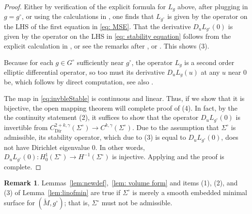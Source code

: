 \documentclass[11pt]{amsart}
\theoremstyle{definition}
\newtheorem{Remark}[Theorem]{Remark}
\numberwithin{equation}{section}
\begin{document}
\begin{proof}
Either by verification of the explicit formula for $L_{g}$ above, after plugging in $g=g^\circ$, or using the calculations in \cite[\S~3.1]{carstea2024calder}, one finds that $L_{g^\circ}$ is given by the operator on the LHS of the first equation in \eqref{eq: MSE}. That the derivative $D_u L_{g^\circ}(0)$ is given by the operator on the LHS in \eqref{eq: stability equation} follows from the explicit calculation in \cite[\S~3.3]{carstea2024calder}, or see the remarks after \cite[Prop.~3.1]{carstea2024calder}, or \cite[Chp.~1~\S~8]{MR2780140}. This shows (3).

Because for each $g\in G^\circ$ sufficiently near $g^\circ$, the operator $L_{g}$ is a second order elliptic differential operator, so too must its derivative $D_u L_{g}(u)$ at any $u$ near $0$ be, which follows by direct computation, see also \cite[\S~17.2]{zbMATH03561752}.

The map in \eqref{eq:invbleStable} is continuous and linear. Thus, if we show that it is bijective, the open mapping theorem will complete proof of (4). In fact, by the the continuity statement (2), it suffices to show that the operator $D_u L_{g^\circ}(0)$ is invertible from $C^{2+k,\gamma}_{\mathrm{Dir}}(\Sigma^\circ)\to C^{k,\gamma}(\Sigma^\circ)$. Due to the assumption that $\Sigma^\circ$ is admissible, its stability operator, which due to (3) is equal to $D_u L_{g^\circ}(0)$, does not have Dirichlet eigenvalue $0$. In other words, $D_u L_{g^\circ}(0)\colon H^1_0(\Sigma^\circ)\to H^{-1}(\Sigma^\circ)$ is injective. Applying \cite[Chp.~5,~Prop.~1.9]{taylor2011partial} and \cite[Lem.~B.1]{LLLS2019inverse} %
the proof is complete.%
\end{proof}

\begin{Remark}
    Lemmas~\ref{lem:newdef},~\ref{lem: volume form} and items (1), (2), and (3) of Lemma~\ref{lem:linofmin} are true if $\Sigma^\circ$ is merely a smooth embedded minimal surface for $(\widetilde{M},g^\circ)$; that is, $\Sigma^\circ$ must not be admissible.
\end{Remark}
\end{document}

